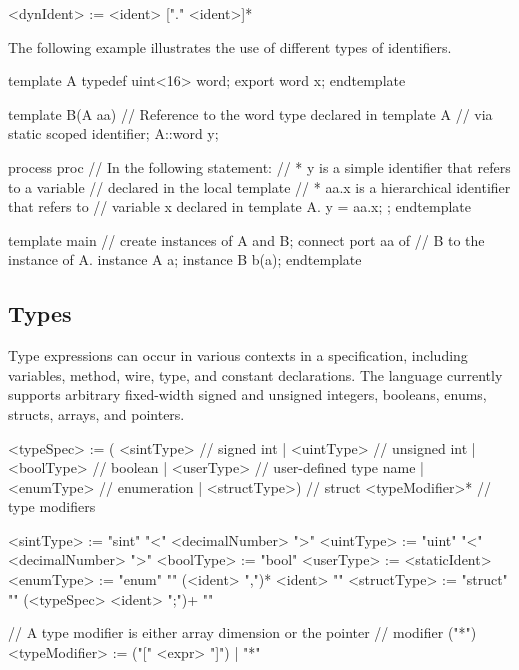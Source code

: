 \begin{bnflisting}
<dynIdent> := <ident> ["." <ident>]*
\end{bnflisting}

The following example illustrates the use of different types of 
identifiers.

\begin{tsllisting2}
template A
  typedef uint<16> word;
  export word x;
endtemplate
    
template B(A aa)
  // Reference to the word type declared in template A
  // via static scoped identifier;
  A::word y;

  process proc {
    // In the following statement:
    // * y is a simple identifier that refers to a variable
    //   declared in the local template
    // * aa.x is a hierarchical identifier that refers to
    //   variable x declared in template A.
    y = aa.x;
  };
endtemplate

template main
  // create instances of A and B; connect port aa of
  // B to the instance of A.
  instance A a;
  instance B b(a);
endtemplate
\end{tsllisting2}


\subsection{Types}

Type expressions can occur in various contexts in a \tsl 
specification, including variables, method, wire, type, and 
constant declarations.  The language currently supports arbitrary 
fixed-width signed and unsigned integers, booleans, enums, 
structs, arrays, and pointers.

\begin{bnflisting}
<typeSpec>   := ( <sintType>    // signed int
                | <uintType>    // unsigned int
                | <boolType>    // boolean
                | <userType>    // user-defined type name
                | <enumType>    // enumeration
                | <structType>) // struct
                <typeModifier>* // type modifiers

<sintType>   := "sint" "<" <decimalNumber> ">"
<uintType>   := "uint" "<" <decimalNumber> ">"
<boolType>   := "bool"
<userType>   := <staticIdent>
<enumType>   := "enum" "{" (<ident> ",")*  <ident> "}"
<structType> := "struct" "{" (<typeSpec> <ident> ";")+ "}"

// A type modifier is either array dimension or the pointer
// modifier ("*")
<typeModifier> := ("[" <expr> "]")
                | "*"
\end{bnflisting}

